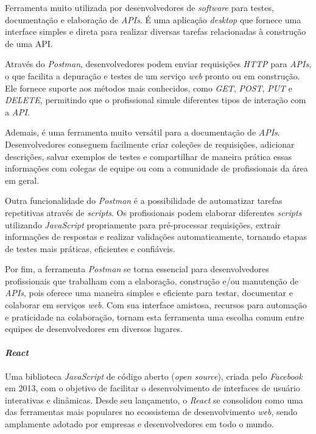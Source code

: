 \documentclass[english,brazilian]{UNISINOSartigo} %
\begin{document}
Ferramenta muito utilizada por desenvolvedores de \textit{software} para testes, documentação e elaboração de \textit{APIs}. É uma aplicação \textit{desktop} que fornece uma interface simples e direta para realizar diversas tarefas relacionadas à construção de uma API.

Através do \textit{Postman}, desenvolvedores podem enviar requisições \textit{HTTP} para \textit{APIs}, o que facilita a depuração e testes de um serviço \textit{web} pronto ou em construção. Ele fornece suporte aos métodos mais conhecidos, como \textit{GET}, \textit{POST}, \textit{PUT} e \textit{DELETE}, permitindo que o profissional simule diferentes tipos de interação com a \textit{API}.

Ademais, é uma ferramenta muito versátil para a documentação de \textit{APIs}. Desenvolvedores conseguem facilmente criar coleções de requisições, adicionar descrições, salvar exemplos de testes e compartilhar de maneira prática essas informações com colegas de equipe ou com a comunidade de profissionais da área em geral.

Outra funcionalidade do \textit{Postman} é a possibilidade de automatizar tarefas repetitivas através de \textit{scripts}. Os profissionais podem elaborar diferentes \textit{scripts} utilizando \textit{JavaScript} propriamente para pré-processar requisições, extrair informações de respostas e realizar validações automaticamente, tornando etapas de testes mais práticas, eficientes e confiáveis.

Por fim, a ferramenta \textit{Postman} se torna essencial para desenvolvedores profissionais que trabalham com a elaboração, construção e/ou manutenção de \textit{APIs}, pois oferece uma maneira simples e eficiente para testar, documentar e colaborar em serviços \textit{web}. Com sua interface amistosa, recursos para automação e praticidade na colaboração, tornam esta ferramenta uma escolha comum entre equipes de desenvolvedores em diversos lugares.

\paragraph{\textit{React}}

Uma biblioteca \textit{JavaScript} de código aberto (\textit{open source}), criada pelo \textit{Facebook} em 2013, com o objetivo de facilitar o desenvolvimento de interfaces de usuário interativas e dinâmicas. Desde seu lançamento, o \textit{React} se consolidou como uma das ferramentas mais populares no ecossistema de desenvolvimento \textit{web}, sendo amplamente adotado por empresas e desenvolvedores em todo o mundo.
\end{document}
